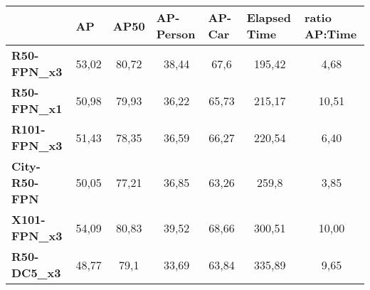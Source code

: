 \documentclass[12pt,a4paper,twocolumn,twoside]{article}
\begin{document}
\begin{table*}[ht]
\centering
\begin{tabularx}{\textwidth}{lcccccc}
\hline
                                            & \multicolumn{1}{l}{\textbf{AP}} & \multicolumn{1}{l}{\textbf{AP50}} & \multicolumn{1}{l}{\textbf{AP-Person}} & \multicolumn{1}{l}{\textbf{AP-Car}} & \multicolumn{1}{l}{\textbf{Elapsed Time}} & \multicolumn{1}{l}{\textbf{ratio AP:Time}} \\ \hline
\multicolumn{1}{|l|}{\textbf{R50-FPN\_x3}}  & \multicolumn{1}{c|}{53,02}      & \multicolumn{1}{c|}{80,72}        & \multicolumn{1}{c|}{38,44}             & 67,6                                & 195,42                                    & 4,68                                       \\ \cline{1-7}
\multicolumn{1}{|l|}{\textbf{R50-FPN\_x1}}  & \multicolumn{1}{c|}{50,98}      & \multicolumn{1}{c|}{79,93}        & \multicolumn{1}{c|}{36,22}             & 65,73                               & 215,17                                    & 10,51                                      \\ \cline{1-7}
\multicolumn{1}{|l|}{\textbf{R101-FPN\_x3}} & \multicolumn{1}{c|}{51,43}      & \multicolumn{1}{c|}{78,35}        & \multicolumn{1}{c|}{36,59}             & 66,27                               & 220,54                                    & 6,40                                       \\ \cline{1-7}
\multicolumn{1}{|l|}{\textbf{City-R50-FPN}} & \multicolumn{1}{c|}{50,05}      & \multicolumn{1}{c|}{77,21}        & \multicolumn{1}{c|}{36,85}             & 63,26                               & 259,8                                     & 3,85                                       \\ \cline{1-7}
\multicolumn{1}{|l|}{\textbf{X101-FPN\_x3}} & \multicolumn{1}{c|}{54,09}      & \multicolumn{1}{c|}{80,83}        & \multicolumn{1}{c|}{39,52}             & 68,66                               & 300,51                                    & 10,00                                      \\ \cline{1-7}
\multicolumn{1}{|l|}{\textbf{R50-DC5\_x3}}  & \multicolumn{1}{c|}{48,77}      & \multicolumn{1}{c|}{79,1}         & \multicolumn{1}{c|}{33,69}             & 63,84                               & 335,89                                    & 9,65                                       \\ \cline{1-7}

\end{tabularx}
\end{table*}
\end{document}
